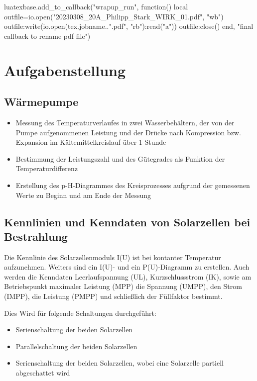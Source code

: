 \documentclass[12pt,english,ngerman]{scrartcl}
\begin{document}
\begin{luacode*}
	luatexbase.add_to_callback("wrapup_run", function()
	local outfile=io.open("20230308_20A_Philipp_Stark_WIRK_01.pdf", "wb")
	outfile:write(io.open(tex.jobname..".pdf", "rb"):read("a"))
	outfile:close()
	end, "final callback to rename pdf file")
\end{luacode*}

% 
\tableofcontents


\section{Aufgabenstellung\label{Auf}}

\subsection{Wärmepumpe}

\begin{itemize}
	\item Messung des Temperaturverlaufes in zwei Wasserbehältern, der von der Pumpe 
	aufgenommenen Leistung und der Drücke nach Kompression bzw. Expansion im Kältemittelkreislauf über 1 Stunde
	\item Bestimmung der Leistungszahl und des Gütegrades als Funktion der Temperaturdifferenz
	\item Erstellung des p-H-Diagrammes des Kreisprozesses aufgrund der gemessenen Werte zu Beginn und am Ende der Messung
\end{itemize}
\subsection{Kennlinien und Kenndaten von Solarzellen bei Bestrahlung}

Die Kennlinie des Solarzellenmoduls I(U) ist bei kontanter Temperatur aufzunehmen. 
Weiters sind ein I(U)- und ein P(U)-Diagramm zu erstellen. Auch werden die Kenndaten Leerlaufspannung (UL), 
Kurzschlussstrom (IK), sowie am Betriebspunkt maximaler Leistung (MPP) die Spannung (UMPP), den Strom (IMPP), 
die Leistung (PMPP) und schließlich der Füllfaktor bestimmt.

Dies Wird für folgende Schaltungen durchgeführt:

\begin{itemize}
	\item Serienschaltung der beiden Solarzellen
	\item Parallelschaltung der beiden Solarzellen
	\item Serienschaltung der beiden Solarzellen, wobei eine Solarzelle partiell abgeschattet wird
\end{itemize}
\end{document}
